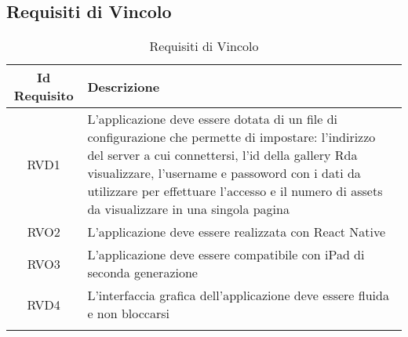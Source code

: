 \subsection{Requisiti di Vincolo}
\normalsize
\begin{longtable}{|c|m{10cm}|}
\hline
\textbf{Id Requisito} & \textbf{Descrizione} \\
\hline
\endhead
RVD1 & L'applicazione deve essere dotata di un file di configurazione che permette di impostare: l'indirizzo del server a cui connettersi, l'id della gallery Rda visualizzare, l'username e passoword con i dati da utilizzare per effettuare l'accesso e il numero di assets da visualizzare in una singola pagina \\ \hline
RVO2 & L'applicazione deve essere realizzata con React Native \\ \hline
RVO3 & L'applicazione deve essere compatibile con iPad di seconda generazione \\ \hline
RVD4 & L'interfaccia grafica dell'applicazione deve essere fluida e non bloccarsi \\ \hline
\caption[Requisiti di Vincolo]{Requisiti di Vincolo}
\label{tabella:req1}
\end{longtable}

